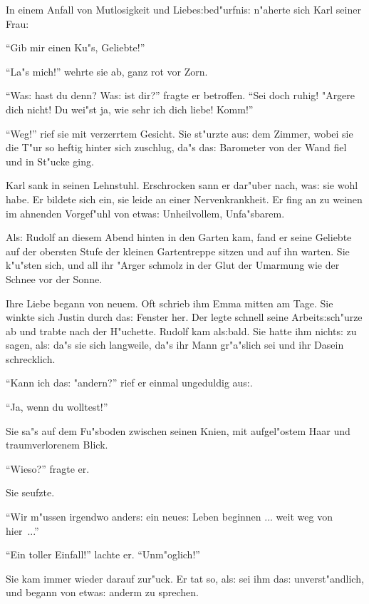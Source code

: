 \documentclass[oneside,12pt]{book}
\newcommand{\s}{s:}%
\begin{document}
In einem Anfall von Mutlosigkeit und Liebe{\s}bed"urfni{\s}
n"aherte sich Karl seiner Frau:

"`Gib mir einen Ku"s, Geliebte!"'

"`La"s mich!"' wehrte sie ab, ganz rot vor Zorn.

"`Wa{\s} hast du denn? Wa{\s} ist dir?"' fragte er betroffen.
"`Sei doch ruhig! "Argere dich nicht! Du wei"st ja, wie sehr ich
dich liebe! Komm!"'

"`Weg!"' rief sie mit verzerrtem Gesicht. Sie st"urzte au{\s} dem
Zimmer, wobei sie die T"ur so heftig hinter sich zuschlug, da"s
da{\s} Barometer von der Wand fiel und in St"ucke ging.

Karl sank in seinen Lehnstuhl. Erschrocken sann er dar"uber nach,
wa{\s} sie wohl habe. Er bildete sich ein, sie leide an einer
Nervenkrankheit. Er fing an zu weinen im ahnenden Vorgef"uhl von
etwa{\s} Unheilvollem, Unfa"sbarem.

Al{\s} Rudolf an diesem Abend hinten in den Garten kam, fand er
seine Geliebte auf der obersten Stufe der kleinen Gartentreppe
sitzen und auf ihn warten. Sie k"u"sten sich, und all ihr "Arger
schmolz in der Glut der Umarmung wie der Schnee vor der Sonne.


\newpage\begin{center}
{\large \so{Zw"olfte{\s} Kapitel}}\bigskip\bigskip
\end{center}

Ihre Liebe begann von neuem. Oft schrieb ihm Emma mitten am Tage.
Sie winkte sich Justin durch da{\s} Fenster her. Der legte schnell
seine Arbeit{\s}sch"urze ab und trabte nach der H"uchette. Rudolf
kam al{\s}bald. Sie hatte ihm nicht{\s} zu sagen, al{\s} da"s sie
sich langweile, da"s ihr Mann gr"a"slich sei und ihr Dasein
schrecklich.

"`Kann ich da{\s} "andern?"' rief er einmal ungeduldig au{\s}.

"`Ja, wenn du wolltest!"'

Sie sa"s auf dem Fu"sboden zwischen seinen Knien, mit aufgel"ostem
Haar und traumverlorenem Blick.

"`Wieso?"' fragte er.

Sie seufzte.

"`Wir m"ussen irgendwo ander{\s} ein neue{\s} Leben beginnen ...
weit weg von hier~..."'

"`Ein toller Einfall!"' lachte er. "`Unm"oglich!"'

Sie kam immer wieder darauf zur"uck. Er tat so, al{\s} sei ihm
da{\s} unverst"andlich, und begann von etwa{\s} anderm zu
sprechen.
\end{document}
